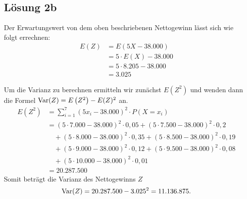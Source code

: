 \documentclass[main.tex]{subfiles}
\begin{document}
\subsection{Lösung 2b}
Der Erwartungswert von dem oben beschriebenen Nettogewinn lässt sich wie folgt errechnen:
$$\begin{aligned}
	E(Z) &= E(5X - 38.000) \\
	&= 5\cdot E(X) - 38.000 \\
	&= 5\cdot 8.205 - 38.000 \\
	&= 3.025
\end{aligned}$$

Um die Varianz zu berechnen ermitteln wir zunächst $E\left(Z^2\right)$ und wenden dann die Formel $\operatorname{Var}(Z) = E\left(Z^2\right) - E(Z)^2$ an.
$$\begin{aligned}
	E\left(Z^2\right) &= \sum_{i=1}^{7}(5x_i - 38.000)^2\cdot P(X = x_i) \\
		   &= (5\cdot  7.000 - 38.000)^2\cdot 0,05
			+ (5\cdot  7.500 - 38.000)^2\cdot 0,2 \\
	 &\quad	+ (5\cdot  8.000 - 38.000)^2\cdot 0,35
	 	    + (5\cdot  8.500 - 38.000)^2\cdot 0,19 \\
	 &\quad + (5\cdot  9.000 - 38.000)^2\cdot 0,12
			+ (5\cdot  9.500 - 38.000)^2\cdot 0,08 \\
	 &\quad + (5\cdot 10.000 - 38.000)^2\cdot 0,01 \\
	 	   &= 20.287.500
\end{aligned}$$
Somit beträgt die Varianz des Nettogewinns $Z$
$$
	\operatorname{Var}(Z) = 20.287.500 - 3.025^2 = 11.136.875.
$$
\end{document}
